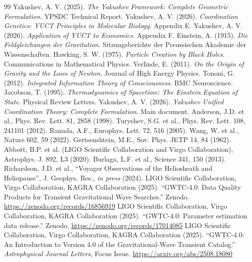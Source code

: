 \documentclass[11pt,a4paper]{article}
\theoremstyle{remark}
\begin{document}
	\begin{thebibliography}{99}
		 Yakushev, A. V. (2025). \emph{The Yakushev Framework: Complete Geometric Formulation}. YPSDC Technical Report.
		 Yakushev, A. V. (2026). \emph{Coordination Genetics: YUCT Principles in Molecular Biology}. Appendix E.
		 Yakushev, A. V. (2026). \emph{Application of YUCT to Economics}. Appendix F.
		 Einstein, A. (1915). \emph{Die Feldgleichungen der Gravitation}. Sitzungsberichte der Preussischen Akademie der Wissenschaften.
		 Hawking, S. W. (1975). \emph{Particle Creation by Black Holes}. Communications in Mathematical Physics.
		 Verlinde, E. (2011). \emph{On the Origin of Gravity and the Laws of Newton}. Journal of High Energy Physics.
		 Tononi, G. (2012). \emph{Integrated Information Theory of Consciousness}. BMC Neuroscience.
		 Jacobson, T. (1995). \emph{Thermodynamics of Spacetime: The Einstein Equation of State}. Physical Review Letters.
		 Yakushev, A. V. (2026). \emph{Yakushev Unified Coordination Theory: Complete Formulation}. Main document.
		 Anderson, J.D. et al., Phys. Rev. Lett. 81, 2858 (1998).
		 Turyshev, S.G. et al., Phys. Rev. Lett. 108, 241101 (2012).
		 Ranada, A.F., Europhys. Lett. 72, 516 (2005).
		 Wang, W. et al., Nature 602, 59 (2022).
		 Gertsenshtein, M.E., Sov. Phys. JETP 14, 84 (1962).
		 Abbott, B.P. et al. (LIGO Scientific Collaboration and Virgo Collaboration), Astrophys. J. 892, L3 (2020).
		 Burlaga, L.F. et al., Science 341, 150 (2013).
		 Richardson, J.D. et al., ``Voyager Observations of the Heliosheath and Heliopause'', J. Geophys. Res., \textit{in press} (2024).
		 LIGO Scientific Collaboration, Virgo Collaboration, KAGRA Collaboration (2025). ``GWTC-4.0: Data Quality Products for Transient Gravitational Wave Searches.'' Zenodo. \url{https://zenodo.org/records/16856919}
		 LIGO Scientific Collaboration, Virgo Collaboration, KAGRA Collaboration (2025). ``GWTC-4.0: Parameter estimation data release.'' Zenodo. \url{https://zenodo.org/records/17014085}
		 LIGO Scientific Collaboration, Virgo Collaboration, KAGRA Collaboration (2025). ``GWTC-4.0: An Introduction to Version 4.0 of the Gravitational-Wave Transient Catalog.'' \textit{Astrophysical Journal Letters}, Focus Issue. \url{https://arxiv.org/abs/2508.18080}

\end{thebibliography}
\end{document}
